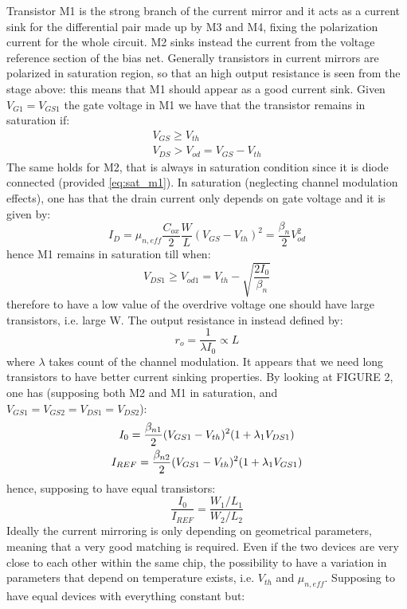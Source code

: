 Transistor M1 is the strong branch of the current mirror and it acts as a current sink for the differential pair made up by M3 and M4, fixing the polarization current for the whole circuit. M2 sinks instead the current from the voltage reference section of the bias net.
Generally transistors in current mirrors are polarized in saturation region, so that an high output resistance is seen from the stage above: this means that M1 should appear as a good current sink.
Given $V_{G1}=V_{GS1}$ the gate voltage in M1 we have that the transistor remains in saturation if:
\begin{gather}
\label{eq:sat_m1}
V_{GS}\geq V_{th}  \\
V_{DS}>V_{od} = V_{GS}-V_{th} 
\end{gather}
The same holds for M2, that is always in saturation condition since it is diode connected (provided \ref{eq:sat_m1}). In saturation (neglecting channel modulation effects), one has that the drain current only depends on gate voltage and it is given by:
\begin{equation}
\label{eq:Id_quadLaw}
I_D = \mu_{n,eff} \frac{C_{ox}}{2} \frac{W}{L} (V_{GS}-V_{th})^2 = \frac{\beta_{n}}{2}V_{od}^2
\end{equation}
hence M1 remains in saturation till when:
\begin{equation}
V_{DS1}\geq V_{od1}= V_{th}-\sqrt{\frac{2I_0}{\beta_{n}}}
\end{equation}
therefore to have a low value of the overdrive voltage one should have large transistors, i.e. large W.
The output resistance in instead defined by:
\begin{equation}
 r_o = \frac{1}{\lambda I_0} \propto L
\end{equation}
where $\lambda$ takes count of the channel modulation. It appears that we need long transistors to have better current sinking properties.
By looking at FIGURE 2, one has (supposing both M2 and M1 in saturation, and $V_{GS1}=V_{GS2}=V_{DS1}=V_{DS2}$):
\begin{gather}
I_0 = \frac{\beta_{n1}}{2}(V_{GS1}-V_{th})^2(1+\lambda_1V_{DS1}) \notag \\
I_{REF} = \frac{\beta_{n2}}{2}(V_{GS1}-V_{th})^2(1+\lambda_1V_{GS1}) \notag
\end{gather}
hence, supposing to have equal transistors:
\begin{equation}
\frac{I_0}{I_{REF}} = \frac{W_1/L_1}{W_2/L_2} 
\end{equation}
Ideally the current mirroring is only depending on geometrical parameters, meaning that a very good matching is required. Even if the two devices are very close to each other within the same chip, the possibility to have a variation in parameters that depend on temperature exists, i.e. $V_{th}$ and $\mu_{n,eff}$. Supposing to have equal devices with everything constant but:
